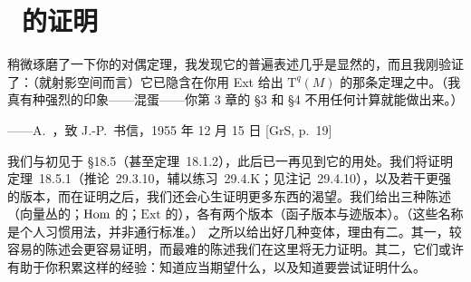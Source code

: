 
\chapter{\hard\ \trSerreDuality{}的证明}
\label{ch:serre-duality}

\epigraph{稍微琢磨了一下你的对偶定理，我发现它的普遍表述几乎是显然的，而且我刚验证了：（就射影空间而言）它已隐含在你用 Ext 给出 $\mathrm{T}^q(M)$ 的那条定理之中。（我真有种强烈的印象——混蛋——你第 3 章的 §3 和 §4 不用任何计算就能做出来。）}{——A.~\trGrothendieck，致 J.-P.~\trSerre 书信，1955 年 12 月 15 日 [GrS, p.~19]}

我们与\trSerreDuality{}初见于 \S18.5（甚至\mbox{定理~18.1.2}），此后已一再见到它的用处。我们将证明\mbox{定理~18.5.1}（\mbox{推论~29.3.10}，辅以\mbox{练习~29.4.K}；见\mbox{注记~29.4.10}），以及若干更强的版本，而在证明之后，我们还会心生证明更多东西的渴望。我们给出三种陈述（向量丛的\trSerreDuality；$\operatorname{Hom}$ 的\trSerreDuality；$\mathrm{Ext}$ 的\trSerreDuality），各有两个版本（函子版本与迹版本）。（这些名称是个人习惯用法，并非通行标准。）
之所以给出好几种变体，理由有二。其一，较容易的陈述会更容易证明，而最难的陈述我们在这里将无力证明。其二，它们或许有助于你积累这样的经验：知道应当期望什么，以及知道要尝试证明什么。





